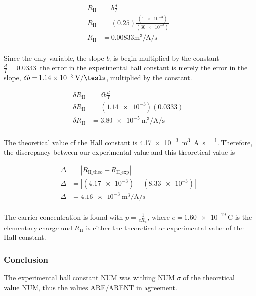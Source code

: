 \documentclass[a4paper]{article}
\begin{document}
\begin{align*}
  R_{\text{H}} &= b \frac{d}{I} \\
  R_{\text{H}} &= (0.25) \frac{(\num{1e-3})}{(\num{30e-3})} \\
  R_{\text{H}} &= \num{0.00833}\si{\cubic\meter\per\ampere\per\second} \\
\end{align*}

\qq Since the only variable, the slope \( b \), is begin multiplied by the constant
\( \frac{d}{I} = \num{0.0333} \), the error in the experimental hall constant is
merely the error in the slope, \( \delta b = \SI{1.14e-3}{\volt\per\tesls} \),
multiplied by the constant.

\begin{align*}
  \delta R_{\text{H}} &= \delta b \frac{d}{I} \\
  \delta R_{\text{H}} &= (\num{1.14e-3}) (\num{0.0333}) \\
  \delta R_{\text{H}} &= \SI{3.80e-5}{\cubic\meter\per\ampere\per\second} \\
\end{align*}

\qq The theoretical value of the Hall constant is
\SI{4.17e-3}{\cubic\meter\per\ampere\per\second}. Therefore, the discrepancy
between our experimental value and this theoretical value is

\begin{align*}
  \Delta &= | R_{\text{H_{theo}}} - R_{\text{H_{exp}}} | \\
  \Delta &= | (\num{4.17e-3}) - (\num{8.33e-3}) | \\
  \Delta &= \SI{4.16e-3}{\cubic\meter\per\ampere\per\second} \\
\end{align*}

\qq The carrier concentration is found with \( p =
\frac{1}{\si{\elementarycharge} R_{\text{H}}} \), where \(
\si{\elementarycharge} = \SI{1.60e-19}{\coulomb} \) is the elementary charge and
\( R_{\text{H}} \) is either the theoretical or experimental value of the Hall constant.




\subsubsection{Conclusion}
\qq The experimental hall constant NUM was withing NUM $\sigma$ of the
theoretical value NUM, thus the values ARE/ARENT in agreement.
\end{document}

